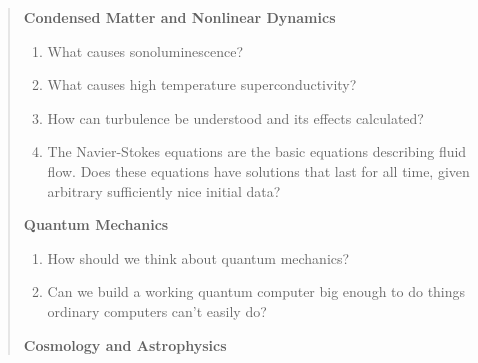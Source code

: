 \documentclass{article}
\begin{document}
\begin{quote}
\textbf{Condensed Matter and Nonlinear Dynamics}

\begin{enumerate}
\def\labelenumi{\arabic{enumi})}
\item
  What causes sonoluminescence?
\item
  What causes high temperature superconductivity?
\item
  How can turbulence be understood and its effects calculated?
\item
  The Navier-Stokes equations are the basic equations describing fluid
  flow. Does these equations have solutions that last for all time,
  given arbitrary sufficiently nice initial data?
\end{enumerate}

\textbf{Quantum Mechanics}

\begin{enumerate}
\def\labelenumi{\arabic{enumi})}
\item
  How should we think about quantum mechanics?
\item
  Can we build a working quantum computer big enough to do things
  ordinary computers can't easily do?
\end{enumerate}

\textbf{Cosmology and Astrophysics}


\end{quote}
\end{document}
